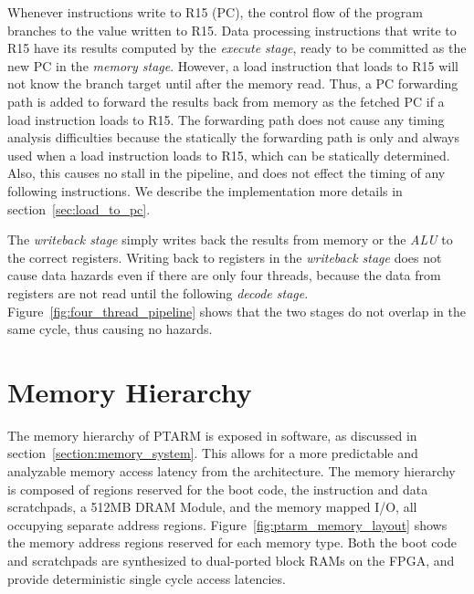 Whenever instructions write to R15 (PC), the control flow of the program branches to the value written to R15.
Data processing instructions that write to R15 have its results computed by the \emph{execute stage}, ready to be committed as the new PC in the \emph{memory stage}.    
However, a load instruction that loads to R15 will not know the branch target until after the memory read.
Thus, a PC forwarding path is added to forward the results back from memory as the fetched PC if a load instruction loads to R15.  
The forwarding path does not cause any timing analysis difficulties because the statically the forwarding path is only and always used when a load instruction loads to R15, which can be statically determined. 
Also, this causes no stall in the pipeline, and does not effect the timing of any following instructions.
We describe the implementation more details in section~\ref{sec:load_to_pc}. 

The \emph{writeback stage} simply writes back the results from memory or the \emph{ALU} to the correct registers.
Writing back to registers in the \emph{writeback stage} does not cause data hazards even if there are only four threads, because the data from registers are not read until the following \emph{decode stage}.
Figure~\ref{fig:four_thread_pipeline} shows that the two stages do not overlap in the same cycle, thus causing no hazards.  

\section{Memory Hierarchy}
\label{sec:ptarm_memory}
The memory hierarchy of PTARM is exposed in software, as discussed in section~\ref{section:memory_system}.
This allows for a more predictable and analyzable memory access latency from the architecture. 
The memory hierarchy is composed of regions reserved for the boot code, the instruction and data scratchpads, a 512MB DRAM Module, and the memory mapped I/O, all occupying separate address regions.
Figure~\ref{fig:ptarm_memory_layout} shows the memory address regions reserved for each memory type.
Both the boot code and scratchpads are synthesized to dual-ported block RAMs on the FPGA, and provide deterministic single cycle access latencies.

